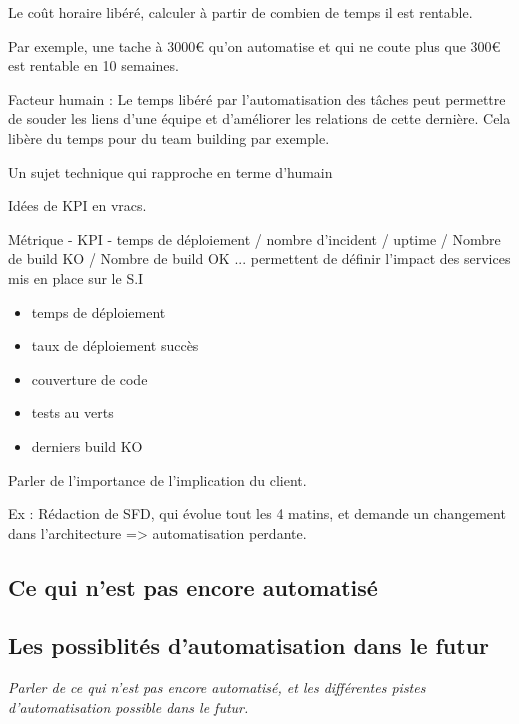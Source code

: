 Le coût horaire libéré, calculer à partir de combien de temps il est rentable.

Par exemple, une tache à 3000€ qu'on automatise et qui ne coute plus que 300€ est rentable en 10 semaines.

Facteur humain : Le temps libéré par l'automatisation des tâches peut permettre de souder les liens d'une équipe et d'améliorer les relations de cette dernière. Cela libère du temps pour du team building par exemple.

Un sujet technique qui rapproche en terme d'humain

Idées de \gls{KPI} en vracs.

Métrique - KPI - temps de déploiement / nombre d'incident / uptime / Nombre de build KO / Nombre de build OK ... permettent de définir l'impact des services mis en place sur le S.I

\begin{itemize}
	\item temps de déploiement
	\item taux de déploiement succès
	\item couverture de code
	\item tests au verts
	\item derniers build KO
\end{itemize}

Parler de l'importance de l'implication du client. 

Ex :  Rédaction de SFD, qui évolue tout les 4 matins, et demande un changement dans l'architecture => automatisation perdante.

\subsection{Ce qui n'est pas encore automatisé}

\subsection{Les possiblités d'automatisation dans le futur}

\textit{Parler de ce qui n'est pas encore automatisé, et les différentes pistes d'automatisation possible dans le futur.}


